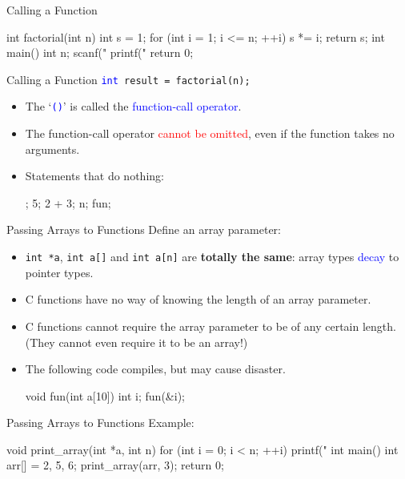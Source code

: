 \documentclass[handout]{beamer}
\newcommand{\red}[1]{\textcolor{red}{#1}}
\newcommand{\blue}[1]{\textcolor{blue}{#1}}
\newcommand{\ttt}[1]{\texttt{#1}}
\newcommand{\bluett}[1]{\blue{\ttt{#1}}}
\begin{document}
\begin{frame}[fragile]{Calling a Function}
	\begin{cpp}
int factorial(int n) {
  int s = 1;
  for (int i = 1; i <= n; ++i)
    s *= i;
  return s;
}
int main() {
  int n;
  scanf("%
  printf("%
  return 0;
}
	\end{cpp}
\end{frame}

\begin{frame}[fragile]{Calling a Function}
	\bluett{int }\ttt{result = factorial(n);}
	\begin{itemize}
		\item The `\bluett{()}' is called the \blue{function-call operator}.
		\item The function-call operator \red{cannot be omitted}, even if the function takes no arguments.
		\pause
		\item Statements that do nothing:
		\begin{cpp}
;
5;
2 + 3;
{}
n;
fun;
		\end{cpp}
	\end{itemize}
\end{frame}

\begin{frame}[fragile]{Passing Arrays to Functions}
	Define an array parameter:
	\begin{itemize}
		\item \ttt{int *a}, \ttt{int a[]} and \ttt{int a[n]} are \textbf{totally the same}: array types \blue{decay} to pointer types.
		\pause
		\item C functions have no way of knowing the length of an array parameter.
		\item C functions cannot require the array parameter to be of any certain length. (They cannot even require it to be an array!)
		\pause
		\item The following code compiles, but may cause disaster.
		\begin{cpp}
void fun(int a[10]) {}
int i;
fun(&i);
		\end{cpp}
	\end{itemize}
\end{frame}

\begin{frame}[fragile]{Passing Arrays to Functions}
	Example:
	\begin{cpp}
void print_array(int *a, int n) {
  for (int i = 0; i < n; ++i)
    printf("%
}
int main() {
  int arr[] = {2, 5, 6};
  print_array(arr, 3);
  return 0;
}
	\end{cpp}
\end{frame}
\end{document}
